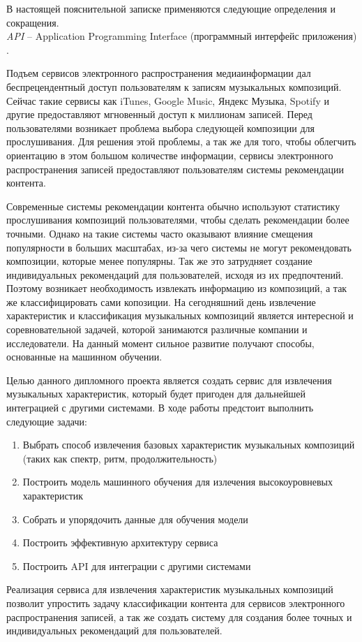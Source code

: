 \label{sec:definitions}

В настоящей пояснительной записке применяются следующие определения и сокращения.
\\

\emph{API} -- Application Programming Interface (программный интерфейс приложения) \cite{istqb_specification}.


\label{sec:introduction}


Подъем сервисов электронного распространения медиаинформации дал беспрецендентный доступ пользователям к записям музыкальных композиций. Сейчас такие сервисы как iTunes, Google Music, Яндекс Музыка, Spotify и другие предоставляют мгновенный доступ к миллионам записей. Перед пользователями возникает проблема выбора следующей композиции для прослушивания. Для решения этой проблемы, а так же для того, чтобы облегчить ориентацию в этом большом количестве информации, сервисы электронного распространения записей предоставляют пользователям системы рекомендации контента.

Современные системы рекомендации контента обычно используют статистику прослушивания композиций пользователями, чтобы сделать рекомендации более точными. Однако на такие системы часто оказывают влияние смещения популярности в больших масштабах, из-за чего системы не могут рекомендовать композиции, которые менее популярны. Так же это затрудняет создание индивидуальных рекомендаций для пользователей, исходя из их предпочтений. Поэтому возникает необходимость извлекать информацию из композиций, а так же классифицировать сами копозиции. На сегодняшний день извлечение характеристик и классификация музыкальных композиций является интересной и соревновательной задачей, которой занимаются различные компании и исследователи. На данный момент сильное развитие получают способы, основанные на машинном обучении.


Целью данного дипломного проекта является создать сервис для извлечения музыкальных характеристик, который будет пригоден для дальнейшей интеграцией с другими системами. В ходе работы предстоит выполнить следующие задачи:
\begin{enumerate}
  \item Выбрать способ извлечения базовых характеристик музыкальных композиций (таких как спектр, ритм, продолжительность)
  \item Построить модель машинного обучения для излечения высокоуровневых характеристик
  \item Собрать и упорядочить данные для обучения модели
  \item Построить эффективную архитектуру сервиса
  \item Построить API для интеграции с другими системами
\end{enumerate}


Реализация сервиса для извлечения характеристик музыкальных композиций позволит упростить задачу классификации контента для сервисов электронного распространения записей, а так же создать систему для создания более точных и индивидуальных рекомендаций для пользователей.
